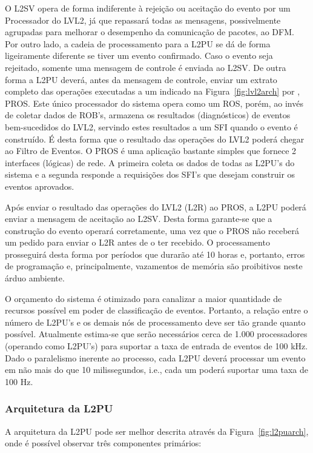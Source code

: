 O L2SV opera de forma indiferente à rejeição ou aceitação do evento por um
Processador do LVL2, já que repassará todas as mensagens, possivelmente
agrupadas para melhorar o desempenho da comunicação de pacotes, ao DFM. Por
outro lado, a cadeia de processamento para a L2PU se dá de forma ligeiramente
diferente se tiver um evento confirmado. Caso o evento seja rejeitado, somente
uma mensagem de controle é enviada ao L2SV. De outra forma a L2PU deverá,
antes da mensagem de controle, enviar um extrato completo das operações
executadas a um  indicado na Figura~\ref{fig:lvl2arch} por
, PROS. Este único processador do sistema opera como um ROS,
porém, ao invés de coletar dados de ROB's, armazena os resultados
(diagnósticos) de eventos bem-sucedidos do LVL2, servindo estes resultados a
um SFI quando o evento é construído. É desta forma que o resultado das
operações do LVL2 poderá chegar ao Filtro de Eventos. O PROS é uma aplicação
bastante simples que fornece 2 interfaces (lógicas) de rede. A primeira coleta
os dados de todas as L2PU's do sistema e a segunda responde a requisições dos
SFI's que desejam construir os eventos aprovados.

Após enviar o resultado das operações do LVL2 (L2R) ao PROS, a L2PU poderá
enviar a mensagem de aceitação ao L2SV. Desta forma garante-se que a
construção do evento operará corretamente, uma vez que o PROS não receberá um
pedido para enviar o L2R antes de o ter recebido. O processamento prosseguirá
desta forma por períodos que durarão até 10 horas e, portanto, erros de
programação e, principalmente, vazamentos de memória são proibitivos neste
árduo ambiente.

O orçamento do sistema é otimizado para canalizar a maior quantidade de
recursos possível em poder de classificação de eventos. Portanto, a relação
entre o número de L2PU's e os demais nós de processamento deve ser tão grande
quanto possível. Atualmente estima-se que serão necessários cerca de 1.000
processadores (operando como L2PU's) para suportar a taxa de entrada de
eventos de 100 kHz. Dado o paralelismo inerente ao processo, cada L2PU deverá
processar um evento em não mais do que 10 milissegundos, i.e., cada um poderá
suportar uma taxa de 100 Hz.

\subsubsection{Arquitetura da L2PU}
\label{sec:l2puarch}

A arquitetura da L2PU pode ser melhor descrita através da
Figura~\ref{fig:l2puarch}, onde é possível observar três componentes primários:

